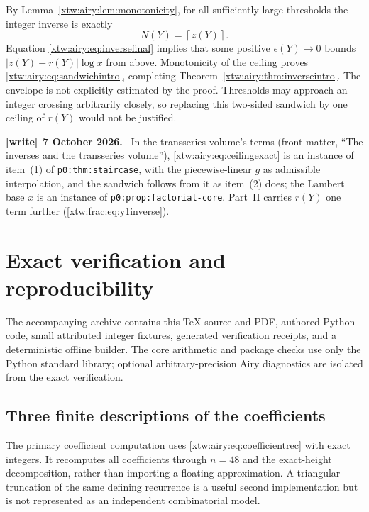 \documentclass[11pt]{article}
\theoremstyle{remark}\newtheorem{remark}[theorem]{Remark}
\newcommand{\ceil}[1]{\left\lceil #1\right\rceil}
\newcommand{\file}[1]{\nolinkurl{#1}}
\newenvironment{writenote}[1][]{\par\smallskip\begingroup\small
 \noindent\textbf{[write]}\if\relax\detokenize{#1}\relax\else~\textbf{#1.}\fi\ }%
 {\par\endgroup\smallskip}
\begin{document}
By Lemma~\ref{xtw:airy:lem:monotonicity}, for all sufficiently large thresholds the
integer inverse is exactly
\begin{equation}\label{xtw:airy:eq:ceilingexact}
 N(Y)=\ceil{z(Y)}.
\end{equation}
Equation \eqref{xtw:airy:eq:inversefinal} implies that some positive
$\epsilon(Y)\to0$ bounds $|z(Y)-r(Y)|\log x$ from above. Monotonicity of the
ceiling proves \eqref{xtw:airy:eq:sandwichintro}, completing
Theorem~\ref{xtw:airy:thm:inverseintro}. The envelope is not explicitly estimated by
the proof. Thresholds may approach an integer crossing arbitrarily closely,
so replacing this two-sided sandwich by one ceiling of $r(Y)$ would not be
justified.
\begin{writenote}[7 October 2026]
In the transseries volume's terms (front matter, ``The inverses and the transseries volume''), \eqref{xtw:airy:eq:ceilingexact} is an instance of item~(1) of \file{p0:thm:staircase}, with the piecewise-linear $g$ as admissible interpolation, and the sandwich follows from it as item~(2) does; the Lambert base $x$ is an instance of \file{p0:prop:factorial-core}. Part~II carries $r(Y)$ one term further (\eqref{xtw:frac:eq:y1inverse}).
\end{writenote}

\section{Exact verification and reproducibility}\label{xtw:airy:sec:verification}
The accompanying archive contains this TeX source and PDF, authored Python
code, small attributed integer fixtures, generated verification receipts,
and a deterministic offline builder. The core arithmetic and package checks
use only the Python standard library; optional arbitrary-precision Airy
diagnostics are isolated from the exact verification.

\subsection{Three finite descriptions of the coefficients}
The primary coefficient computation uses \eqref{xtw:airy:eq:coefficientrec} with
exact integers. It recomputes all coefficients through $n=48$ and the
exact-height decomposition, rather than importing a floating approximation.
A triangular truncation of the same defining recurrence is a useful second
implementation but is not represented as an independent combinatorial model.
\end{document}
